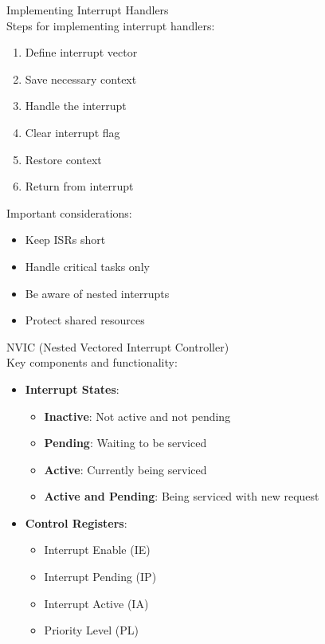 \begin{KR}{Implementing Interrupt Handlers}\\
Steps for implementing interrupt handlers:
\begin{enumerate}
  \item Define interrupt vector
  \item Save necessary context
  \item Handle the interrupt
  \item Clear interrupt flag
  \item Restore context
  \item Return from interrupt
\end{enumerate}

Important considerations:
\begin{itemize}
  \item Keep ISRs short
  \item Handle critical tasks only
  \item Be aware of nested interrupts
  \item Protect shared resources
\end{itemize}
\end{KR}

\begin{concept}{NVIC (Nested Vectored Interrupt Controller)}\\
Key components and functionality:
\begin{itemize}
  \item \textbf{Interrupt States}:
    \begin{itemize}
      \item \textbf{Inactive}: Not active and not pending
      \item \textbf{Pending}: Waiting to be serviced
      \item \textbf{Active}: Currently being serviced
      \item \textbf{Active and Pending}: Being serviced with new request
    \end{itemize}
  \item \textbf{Control Registers}:
    \begin{itemize}
      \item Interrupt Enable (IE)
      \item Interrupt Pending (IP)
      \item Interrupt Active (IA)
      \item Priority Level (PL)
    \end{itemize}
\end{itemize}

\end{concept}

